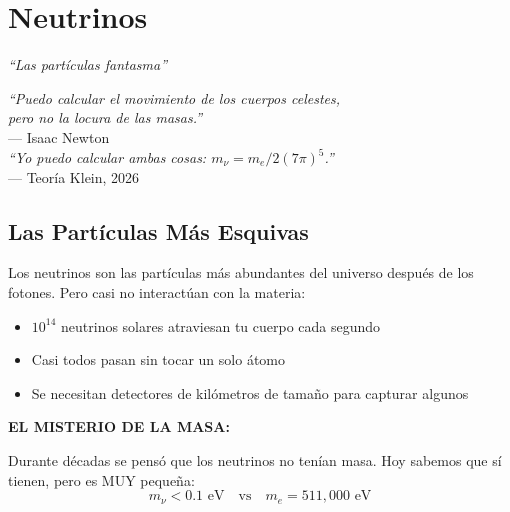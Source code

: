 \chapter{Neutrinos}
\label{cap:neutrinos}

\begin{center}
\textit{``Las partículas fantasma''}
\end{center}

\vspace{0.5cm}

\begin{tcolorbox}[colback=white, colframe=kleinblue, boxrule=2pt]
\centering
\textit{``Puedo calcular el movimiento de los cuerpos celestes,\\
pero no la locura de las masas.''}\\
--- Isaac Newton\\[0.3cm]
\textit{``Yo puedo calcular ambas cosas: $m_\nu = m_e / 2(7\pi)^5$.''}\\
--- Teoría Klein, 2026
\end{tcolorbox}


\section{Las Partículas Más Esquivas}

Los neutrinos son las partículas más abundantes del universo después de los fotones.
Pero casi no interactúan con la materia:

\begin{itemize}
    \item $10^{14}$ neutrinos solares atraviesan tu cuerpo cada segundo
    \item Casi todos pasan sin tocar un solo átomo
    \item Se necesitan detectores de kilómetros de tamaño para capturar algunos
\end{itemize}

\textbf{EL MISTERIO DE LA MASA:}

Durante décadas se pensó que los neutrinos no tenían masa.
Hoy sabemos que sí tienen, pero es MUY pequeña:
\begin{equation}
m_\nu < 0.1 \text{ eV} \quad \text{vs} \quad m_e = 511,000 \text{ eV}
\end{equation}

